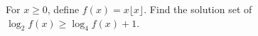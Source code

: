 For $x\ge0$, define $f(x)=x\lfloor x\rfloor$. Find the solution set of $\log_2f(x)\ge\log_4f(x)+1$.
